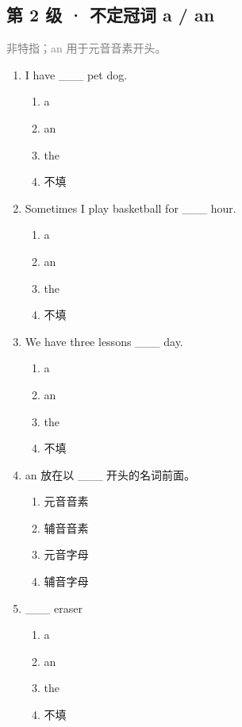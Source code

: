 \documentclass[11pt,a4paper]{ctexart}
\begin{document}
\subsection*{第 2 级 · 不定冠词 a / an}
\noindent\textcolor{gray}{非特指；an 用于元音音素开头。}\par\smallskip
\begin{enumerate}[leftmargin=*,itemsep=4pt]
\item I have \_\_\_ pet dog.
\begin{enumerate}[label=\Alph*.,leftmargin=2em,itemsep=1pt,topsep=2pt]
\item a
\item an
\item the
\item 不填
\end{enumerate}
\item Sometimes I play basketball for \_\_\_ hour.
\begin{enumerate}[label=\Alph*.,leftmargin=2em,itemsep=1pt,topsep=2pt]
\item a
\item an
\item the
\item 不填
\end{enumerate}
\item We have three lessons \_\_\_ day.
\begin{enumerate}[label=\Alph*.,leftmargin=2em,itemsep=1pt,topsep=2pt]
\item a
\item an
\item the
\item 不填
\end{enumerate}
\item an 放在以 \_\_\_ 开头的名词前面。
\begin{enumerate}[label=\Alph*.,leftmargin=2em,itemsep=1pt,topsep=2pt]
\item 元音音素
\item 辅音音素
\item 元音字母
\item 辅音字母
\end{enumerate}
\item \_\_\_ eraser
\begin{enumerate}[label=\Alph*.,leftmargin=2em,itemsep=1pt,topsep=2pt]
\item a
\item an
\item the
\item 不填
\end{enumerate}

\end{enumerate}
\end{document}

